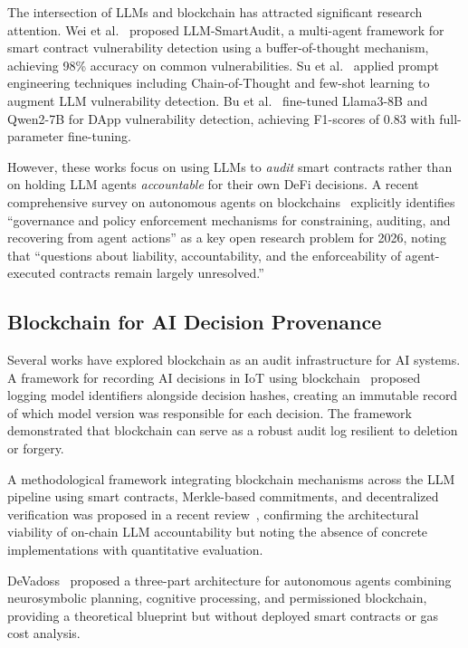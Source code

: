 \documentclass[manuscript,nonacm]{acmart}
\begin{document}
The intersection of LLMs and blockchain has attracted significant research attention. Wei et al.~\cite{llm_smartaudit} proposed LLM-SmartAudit, a multi-agent framework for smart contract vulnerability detection using a buffer-of-thought mechanism, achieving 98\% accuracy on common vulnerabilities. Su et al.~\cite{su2026detection} applied prompt engineering techniques including Chain-of-Thought and few-shot learning to augment LLM vulnerability detection. Bu et al.~\cite{bu2026dapp} fine-tuned Llama3-8B and Qwen2-7B for DApp vulnerability detection, achieving F1-scores of 0.83 with full-parameter fine-tuning.

However, these works focus on using LLMs to \emph{audit} smart contracts rather than on holding LLM agents \emph{accountable} for their own DeFi decisions. A recent comprehensive survey on autonomous agents on blockchains~\cite{autonomous_agents_blockchain} explicitly identifies ``governance and policy enforcement mechanisms for constraining, auditing, and recovering from agent actions'' as a key open research problem for 2026, noting that ``questions about liability, accountability, and the enforceability of agent-executed contracts remain largely unresolved.''

\subsection{Blockchain for AI Decision Provenance}

Several works have explored blockchain as an audit infrastructure for AI systems. A framework for recording AI decisions in IoT using blockchain~\cite{ai_iot_blockchain} proposed logging model identifiers alongside decision hashes, creating an immutable record of which model version was responsible for each decision. The framework demonstrated that blockchain can serve as a robust audit log resilient to deletion or forgery.

A methodological framework integrating blockchain mechanisms across the LLM pipeline using smart contracts, Merkle-based commitments, and decentralized verification was proposed in a recent review~\cite{blockchain_llm_review}, confirming the architectural viability of on-chain LLM accountability but noting the absence of concrete implementations with quantitative evaluation.

DeVadoss~\cite{devadoss2026permissioned} proposed a three-part architecture for autonomous agents combining neurosymbolic planning, cognitive processing, and permissioned blockchain, providing a theoretical blueprint but without deployed smart contracts or gas cost analysis.
\end{document}
